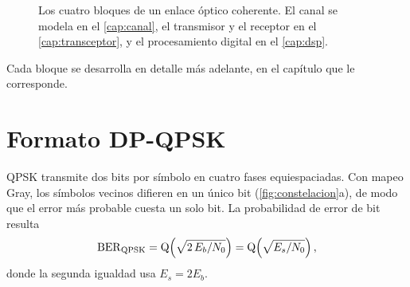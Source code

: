 \begin{figure}[H]
  \centering
  \caption[Esquema del enlace \'optico coherente]{%
    Los cuatro bloques de un enlace \'optico coherente. El canal se modela en
    el \cref{cap:canal}, el transmisor y el receptor en el
    \cref{cap:transceptor}, y el procesamiento digital en el \cref{cap:dsp}.}
  \label{fig:enlace-panorama}
\end{figure}

Cada bloque se desarrolla en detalle m\'as adelante, en el
cap\'itulo que le corresponde.

\section{Formato DP-QPSK}
\label{sec:coh-dpqpsk}

QPSK transmite dos bits por s\'imbolo en cuatro fases equiespaciadas. Con mapeo
Gray, los s\'imbolos vecinos difieren en un \'unico bit
(\cref{fig:constelacion}a), de modo que el error m\'as probable cuesta un solo
bit. La probabilidad de error de bit resulta
\begin{equation}
  \mathrm{BER}_{\mathrm{QPSK}} = \operatorname{Q}\!\left(\sqrt{2\,E_{b}/N_{0}}\right)
                       = \operatorname{Q}\!\left(\sqrt{E_{s}/N_{0}}\right),
  \label{eq:ber-qpsk}
\end{equation}
donde la segunda igualdad usa $E_s = 2E_b$.

